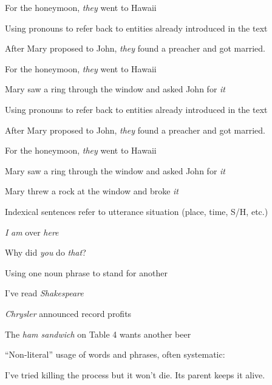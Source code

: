 \documentclass{article}
\begin{document}
\begin{huge}
For the honeymoon, \emph{they} went to Hawaii



Using pronouns to refer back to entities already introduced in the text

After Mary proposed to John, \emph{they} found a preacher and got married.

For the honeymoon, \emph{they} went to Hawaii

Mary saw a ring through the window and asked John for \emph{it}



Using pronouns to refer back to entities already introduced in the text

After Mary proposed to John, \emph{they} found a preacher and got married.

For the honeymoon, \emph{they} went to Hawaii

Mary saw a ring through the window and asked John for \emph{it}

Mary threw a rock at the window and broke \emph{it}



Indexical sentences refer to utterance situation (place, time, S/H, etc.)

\emph{I} \emph{am} over \emph{here}

Why did \emph{you} do \emph{that}?



Using one noun phrase to stand for another

I've read \emph{Shakespeare}

\emph{Chrysler} announced record profits

The \emph{ham sandwich} on Table 4 wants another beer



``Non-literal'' usage of words and phrases, often systematic:

I've tried killing the process but it won't die. Its parent keeps it alive.




\end{huge}
\end{document}
